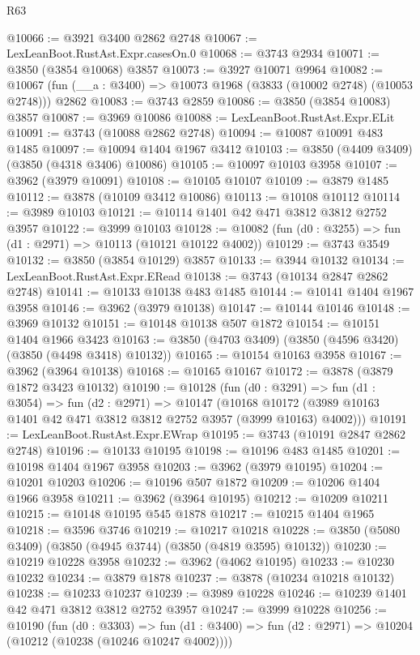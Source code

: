 \begin{lexlean}{R63}
\begin{coremodule}
@10066 := @3921 @3400 @2862 @2748
@10067 := LexLeanBoot.RustAst.Expr.casesOn.{0}
@10068 := @3743 @2934
@10071 := @3850 (@3854 @10068) @3857
@10073 := @3927 @10071 @9964
@10082 := @10067 (fun (__a : @3400) => @10073 @1968 (@3833 (@10002 @2748) (@10053 @2748))) @2862
@10083 := @3743 @2859
@10086 := @3850 (@3854 @10083) @3857
@10087 := @3969 @10086
@10088 := LexLeanBoot.RustAst.Expr.ELit
@10091 := @3743 (@10088 @2862 @2748)
@10094 := @10087 @10091 @483 @1485
@10097 := @10094 @1404 @1967 @3412
@10103 := @3850 (@4409 @3409) (@3850 (@4318 @3406) @10086)
@10105 := @10097 @10103 @3958
@10107 := @3962 (@3979 @10091)
@10108 := @10105 @10107
@10109 := @3879 @1485
@10112 := @3878 (@10109 @3412 @10086)
@10113 := @10108 @10112
@10114 := @3989 @10103
@10121 := @10114 @1401 @42 @471 @3812 @3812 @2752 @3957
@10122 := @3999 @10103
@10128 := @10082 (fun (d0 : @3255) => fun (d1 : @2971) => @10113 (@10121 @10122 @4002))
@10129 := @3743 @3549
@10132 := @3850 (@3854 @10129) @3857
@10133 := @3944 @10132
@10134 := LexLeanBoot.RustAst.Expr.ERead
@10138 := @3743 (@10134 @2847 @2862 @2748)
@10141 := @10133 @10138 @483 @1485
@10144 := @10141 @1404 @1967 @3958
@10146 := @3962 (@3979 @10138)
@10147 := @10144 @10146
@10148 := @3969 @10132
@10151 := @10148 @10138 @507 @1872
@10154 := @10151 @1404 @1966 @3423
@10163 := @3850 (@4703 @3409) (@3850 (@4596 @3420) (@3850 (@4498 @3418) @10132))
@10165 := @10154 @10163 @3958
@10167 := @3962 (@3964 @10138)
@10168 := @10165 @10167
@10172 := @3878 (@3879 @1872 @3423 @10132)
@10190 := @10128
    (fun (d0 : @3291) =>
    fun (d1 : @3054) =>
    fun (d2 : @2971) =>
    @10147
      (@10168 @10172 (@3989 @10163 @1401 @42 @471 @3812 @3812 @2752 @3957 (@3999 @10163) @4002)))
@10191 := LexLeanBoot.RustAst.Expr.EWrap
@10195 := @3743 (@10191 @2847 @2862 @2748)
@10196 := @10133 @10195
@10198 := @10196 @483 @1485
@10201 := @10198 @1404 @1967 @3958
@10203 := @3962 (@3979 @10195)
@10204 := @10201 @10203
@10206 := @10196 @507 @1872
@10209 := @10206 @1404 @1966 @3958
@10211 := @3962 (@3964 @10195)
@10212 := @10209 @10211
@10215 := @10148 @10195 @545 @1878
@10217 := @10215 @1404 @1965
@10218 := @3596 @3746
@10219 := @10217 @10218
@10228 := @3850 (@5080 @3409) (@3850 (@4945 @3744) (@3850 (@4819 @3595) @10132))
@10230 := @10219 @10228 @3958
@10232 := @3962 (@4062 @10195)
@10233 := @10230 @10232
@10234 := @3879 @1878
@10237 := @3878 (@10234 @10218 @10132)
@10238 := @10233 @10237
@10239 := @3989 @10228
@10246 := @10239 @1401 @42 @471 @3812 @3812 @2752 @3957
@10247 := @3999 @10228
@10256 := @10190
    (fun (d0 : @3303) =>
    fun (d1 : @3400) => fun (d2 : @2971) => @10204 (@10212 (@10238 (@10246 @10247 @4002))))

\end{coremodule}
\end{lexlean}
